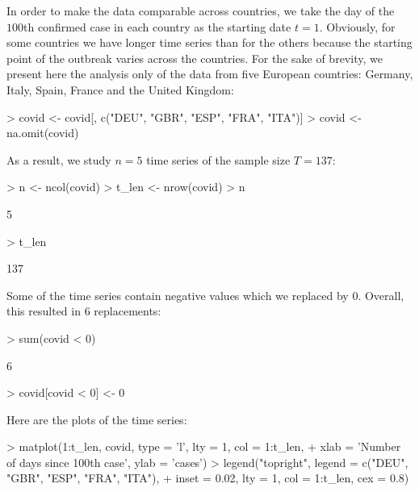 \documentclass[a4paper]{scrartcl}
\begin{document}
In order to make the data comparable across countries, we take the day of the $100$th confirmed case in each country as the starting date $t = 1$. Obviously, for some countries we have longer time series than for the others because the starting point of the outbreak varies across the countries. For the sake of brevity, we present here the analysis only of the data from five European countries: Germany, Italy, Spain, France and the United Kingdom:

\begin{Schunk}
\begin{Sinput}
> covid <- covid[, c("DEU", "GBR", "ESP", "FRA", "ITA")]
> covid <- na.omit(covid)
\end{Sinput}
\end{Schunk}

As a result, we study $n = 5$ time series of the sample size $T = 137$:

\begin{Schunk}
\begin{Sinput}
> n     <- ncol(covid)
> t_len <- nrow(covid)
> n
\end{Sinput}
\begin{Soutput}
[1] 5
\end{Soutput}
\begin{Sinput}
> t_len
\end{Sinput}
\begin{Soutput}
[1] 137
\end{Soutput}
\end{Schunk}

Some of the time series contain negative values which we replaced by $0$. Overall, this resulted in $6$ replacements:

\begin{Schunk}
\begin{Sinput}
> sum(covid < 0)
\end{Sinput}
\begin{Soutput}
[1] 6
\end{Soutput}
\begin{Sinput}
> covid[covid < 0] <- 0
\end{Sinput}
\end{Schunk}

Here are the plots of the time series:

\begin{Schunk}
\begin{Sinput}
> matplot(1:t_len, covid, type = 'l', lty = 1, col = 1:t_len,
+         xlab = 'Number of days since 100th case', ylab = 'cases')
> legend("topright", legend = c("DEU", "GBR", "ESP", "FRA", "ITA"),
+        inset = 0.02, lty = 1, col = 1:t_len, cex = 0.8)
\end{Sinput}
\end{Schunk}
\end{document}
